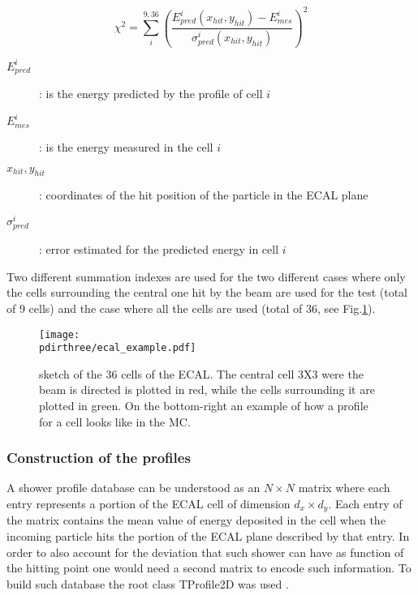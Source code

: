 \begin{equation}
  \chi^2 = \sum^{9,36}_i \left(\frac{E_{pred}^i(x_{hit},y_{hit})-E_{mes}^i}{\sigma^{i}_{pred}(x_{hit},y_{hit})}\right)^2
  \label{eqn:chi}
\end{equation}


\begin{description}
\item[$E_{pred}^i$]: is the energy predicted by the profile of cell
  $i$
\item[$E_{mes}^i$]: is the energy measured in the cell $i$
\item[$x_{hit},y_{hit}$]: coordinates of the hit position of the
  particle in the ECAL plane
\item [$\sigma^{i}_{pred}$]: error estimated for the predicted energy
  in cell $i$
\end{description}


Two different summation indexes are used for the two different cases
where only the cells surrounding the central one hit by the beam are
used for the test (total of 9 cells) and the case where all the cells
are used (total of 36, see Fig.\ref{fig:ecal_example}).

\begin{figure}[h!]
  \begin{center}
    \texttt{[image: \\pdirthree/ecal\_example.pdf]}
  \end{center}
  \caption[ECAL sketch]{sketch of the 36 cells of the ECAL. The central cell 3X3
    were the beam is directed is plotted in red, while the cells
    surrounding it are plotted in green. On the bottom-right an
    example of how a profile for a cell looks like in the MC.}
  \label{fig:ecal_example}
\end{figure}


 
\subsubsection{Construction of the profiles}
\label{ch3:sec:make_profile}

A shower profile database can be understood as an $N\times N$ matrix
where each entry represents a portion of the ECAL cell of dimension
$d_x \times d_y$. Each entry of the matrix contains the mean value of
energy deposited in the cell when the incoming particle hits the
portion of the ECAL plane described by that entry. In order to also
account for the deviation that such shower can have as function of the
hitting point one would need a second matrix to encode such
information. To build such database the root class TProfile2D was used \cite{root-tprofile}.

